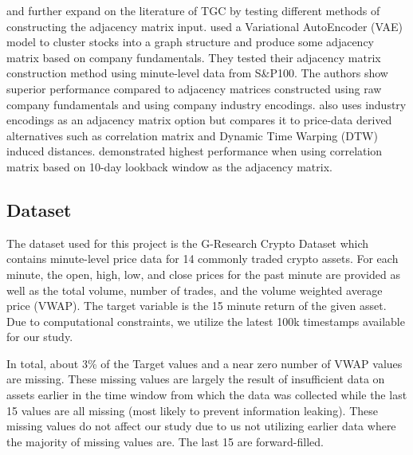\cite{Hou2021} and \cite{Peng2021} further expand on the literature of TGC by testing different methods of constructing the adjacency matrix input. \cite{Hou2021} used a Variational AutoEncoder (VAE) model to cluster stocks into a graph structure and produce some adjacency matrix based on company fundamentals. They tested their adjacency matrix construction method using minute-level data from S\&P100. The authors show superior performance compared to adjacency matrices constructed using raw company fundamentals and using company industry encodings. \cite{Peng2021} also uses industry encodings as an adjacency matrix option but compares it to price-data derived alternatives such as correlation matrix and Dynamic Time Warping (DTW) induced distances. \citeauthor{Peng2021} demonstrated highest performance when using correlation matrix based on 10-day lookback window as the adjacency matrix.

\subsection{Dataset} \label{Dataset}

The dataset used for this project is the G-Research Crypto Dataset which contains minute-level price data for 14 commonly traded crypto assets. For each minute, the open, high, low, and close prices for the past minute are provided as well as the total volume, number of trades, and the volume weighted average price (VWAP). The target variable is the 15 minute return of the given asset. Due to computational constraints, we utilize the latest 100k timestamps available for our study.

In total, about 3\% of the Target values and a near zero number of VWAP values are missing. These missing values are largely the result of insufficient data on assets earlier in the time window from which the data was collected while the last 15 values are all missing (most likely to prevent information leaking). These missing values do not affect our study due to us not utilizing earlier data where the majority of missing values are. The last 15 are forward-filled.


